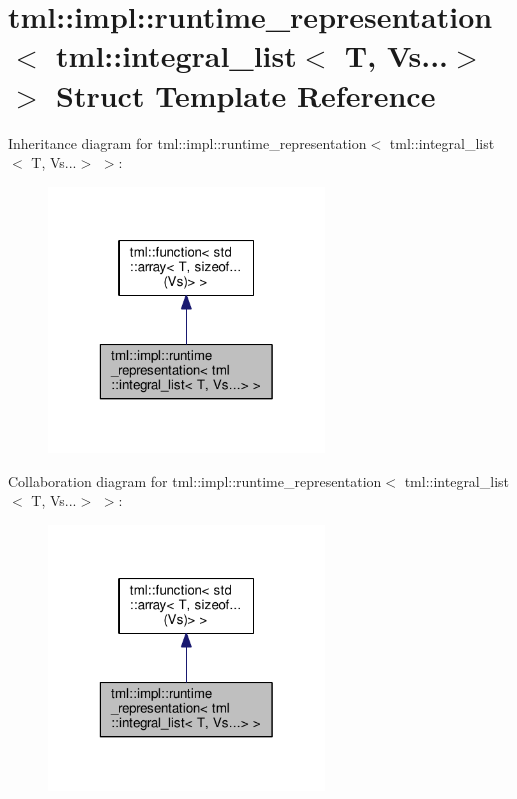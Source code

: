 \hypertarget{structtml_1_1impl_1_1runtime__representation_3_01tml_1_1integral__list_3_01_t_00_01_vs_8_8_8_4_01_4}{\section{tml\+:\+:impl\+:\+:runtime\+\_\+representation$<$ tml\+:\+:integral\+\_\+list$<$ T, Vs...$>$ $>$ Struct Template Reference}
\label{structtml_1_1impl_1_1runtime__representation_3_01tml_1_1integral__list_3_01_t_00_01_vs_8_8_8_4_01_4}
}


Inheritance diagram for tml\+:\+:impl\+:\+:runtime\+\_\+representation$<$ tml\+:\+:integral\+\_\+list$<$ T, Vs...$>$ $>$\+:
\nopagebreak
\begin{figure}[H]
\begin{center}
\leavevmode
\includegraphics[width=208pt]{structtml_1_1impl_1_1runtime__representation_3_01tml_1_1integral__list_3_01_t_00_01_vs_8_8_8_4_01_4__inherit__graph}
\end{center}
\end{figure}


Collaboration diagram for tml\+:\+:impl\+:\+:runtime\+\_\+representation$<$ tml\+:\+:integral\+\_\+list$<$ T, Vs...$>$ $>$\+:
\nopagebreak
\begin{figure}[H]
\begin{center}
\leavevmode
\includegraphics[width=208pt]{structtml_1_1impl_1_1runtime__representation_3_01tml_1_1integral__list_3_01_t_00_01_vs_8_8_8_4_01_4__coll__graph}
\end{center}
\end{figure}

